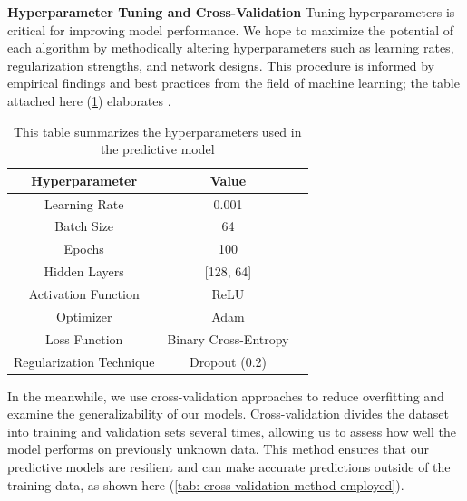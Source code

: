 \documentclass[manuscript,screen,]{acmart}
\begin{document}
\textbf{Hyperparameter Tuning and Cross-Validation}
Tuning hyperparameters is critical for improving model performance. We hope to maximize the potential of each algorithm by methodically altering hyperparameters such as learning rates, regularization strengths, and network designs. This procedure is informed by empirical findings and best practices from the field of machine learning; the table attached here (\ref{tab: hyperparameters used in the predictive model}) elaborates \cite{xia2021intelligent}.

\begin{table}[h]
    \centering
    \begin{tabular}{|c|c|c|}
    \hline
    Hyperparameter & Value\\
    \hline
    Learning Rate & 0.001\\
    \hline
    Batch Size & 64\\
    \hline
    Epochs & 100\\
    \hline
    Hidden Layers & [128, 64]\\
    \hline
    Activation Function & ReLU\\
    \hline
    Optimizer & Adam\\
    \hline
    Loss Function & Binary Cross-Entropy\\
    \hline
    Regularization Technique & Dropout (0.2)\\
    \hline
    \end{tabular}
    \caption{This table summarizes the hyperparameters used in the predictive model}
    \label{tab: hyperparameters used in the predictive model}
    
\end{table}

In the meanwhile, we use cross-validation approaches to reduce overfitting and examine the generalizability of our models. Cross-validation divides the dataset into training and validation sets several times, allowing us to assess how well the model performs on previously unknown data. This method ensures that our predictive models are resilient and can make accurate predictions outside of the training data, as shown here (\ref{tab: cross-validation method employed}).
\end{document}
